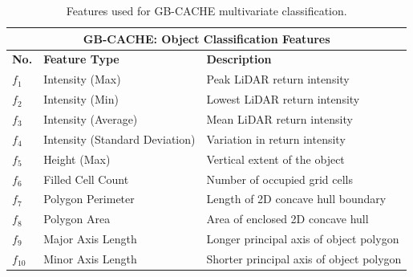 \documentclass{erauthesis}
\begin{document}



\begin{table}[htbp]
\centering
\begin{tabular}{lll}
\hline
\multicolumn{3}{c}{GB-CACHE: Object Classification Features}\\
\hline
\hline
\textbf{No.} & \textbf{Feature Type} & \textbf{Description} \\ 
\hline
$f_1$ & Intensity (Max) & Peak LiDAR return intensity \\
$f_2$ & Intensity (Min) & Lowest LiDAR return intensity \\
$f_3$ & Intensity (Average) & Mean LiDAR return intensity \\
$f_4$ & Intensity (Standard Deviation) & Variation in return intensity \\
$f_5$ & Height (Max) & Vertical extent of the object \\
$f_6$ & Filled Cell Count & Number of occupied grid cells \\
$f_7$ & Polygon Perimeter & Length of 2D concave hull boundary \\
$f_8$ & Polygon Area & Area of enclosed 2D concave hull \\
$f_9$ & Major Axis Length & Longer principal axis of object polygon \\
$f_{10}$ & Minor Axis Length & Shorter principal axis of object polygon \\
\hline
\end{tabular}
\caption{Features used for GB-CACHE multivariate classification.}
\label{tab:gbcache_features}
\end{table}
\end{document}
